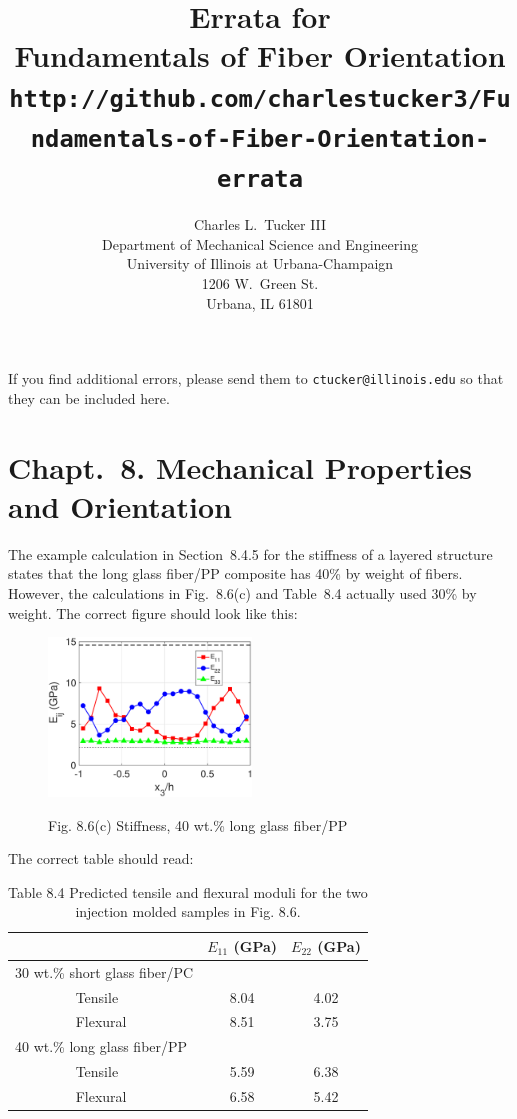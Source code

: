 \documentclass[11pt]{article}
\title{Errata for \\
      \textbf{Fundamentals of Fiber Orientation} \\
      { \normalsize \texttt{http://github.com/charlestucker3/Fundamentals-of-Fiber-Orientation-errata}} }
\author{Charles L.~Tucker III \\
       Department of Mechanical Science and Engineering \\
        University of Illinois at Urbana-Champaign \\
        1206 W.~Green St. \\
        Urbana, IL 61801 \\
        }
\begin{document}
\maketitle

If you find additional errors, please send them to \texttt{ctucker@illinois.edu} so that they can be included here.

\section*{Chapt.\ 8. Mechanical Properties and Orientation}

The example calculation in Section~8.4.5 for the stiffness of a layered structure states that the long glass fiber/PP composite has 40\% by weight of fibers.  However, the calculations in Fig.~8.6(c) and Table~8.4 actually used 30\% by weight.  The correct figure should look like this:
\begin{figure}[h]
   \centering
    \includegraphics[width = 0.48\textwidth, trim = 0  0 0 0, clip = true, keepaspectratio = true]{FODexample2E.eps} \\
    \caption*{Fig. 8.6(c) Stiffness, 40 wt.\% long glass fiber/PP}
\end{figure}

\newpage %
\noindent The correct table should read:
\begin{table}[h]
    \centering
     \caption*{Table 8.4 Predicted tensile and flexural moduli for the two injection molded samples in Fig. 8.6.}
         \begin{tabular}{l|c|c}
                  & $E_{11}$ (GPa)     & $E_{22}$ (GPa)   \\ 
                  \hline
                  30 wt.\% short glass fiber/PC & & \\
                  ~~~~~~~~ Tensile   & 8.04  & 4.02 \\
                  ~~~~~~~~ Flexural  & 8.51 & 3.75 \\
                  \hline
                  40 wt.\% long glass fiber/PP & & \\
                  ~~~~~~~~ Tensile   & 5.59  & 6.38 \\
                  ~~~~~~~~ Flexural  & 6.58 & 5.42 
           \end{tabular}
    \end{table}
\end{document}

